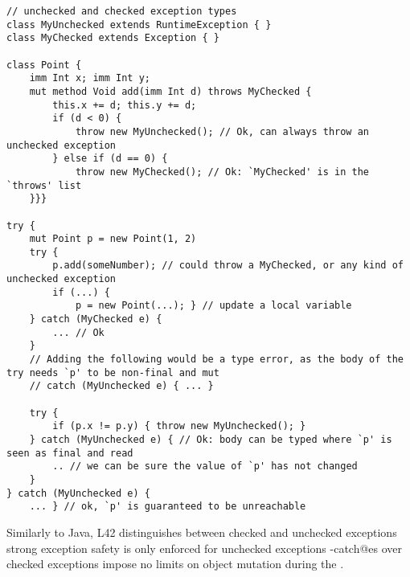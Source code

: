 \SS
\begin{lstlisting}
// unchecked and checked exception types
class MyUnchecked extends RuntimeException { }
class MyChecked extends Exception { }

class Point {
	imm Int x; imm Int y;
	mut method Void add(imm Int d) throws MyChecked {
		this.x += d; this.y += d;
		if (d < 0) {
			throw new MyUnchecked(); // Ok, can always throw an unchecked exception
		} else if (d == 0) {
			throw new MyChecked(); // Ok: `MyChecked' is in the `throws' list
	}}}

try {
	mut Point p = new Point(1, 2)
	try {
		p.add(someNumber); // could throw a MyChecked, or any kind of unchecked exception
		if (...) {
			p = new Point(...); } // update a local variable
	} catch (MyChecked e) {
		... // Ok
	}
	// Adding the following would be a type error, as the body of the try needs `p' to be non-final and mut
	// catch (MyUnchecked e) { ... }

	try {
		if (p.x != p.y) { throw new MyUnchecked(); }
	} catch (MyUnchecked e) { // Ok: body can be typed where `p' is seen as final and read
		.. // we can be sure the value of `p' has not changed
	}
} catch (MyUnchecked e) {
	... } // ok, `p' is guaranteed to be unreachable
\end{lstlisting}

Similarly to Java, L42 distinguishes between checked and unchecked exceptions\IO[2.3]{,} strong exception safety is only enforced for unchecked exceptions
\Q@try-catch@es over checked exceptions impose no limits on object mutation during the \Q@try@.







